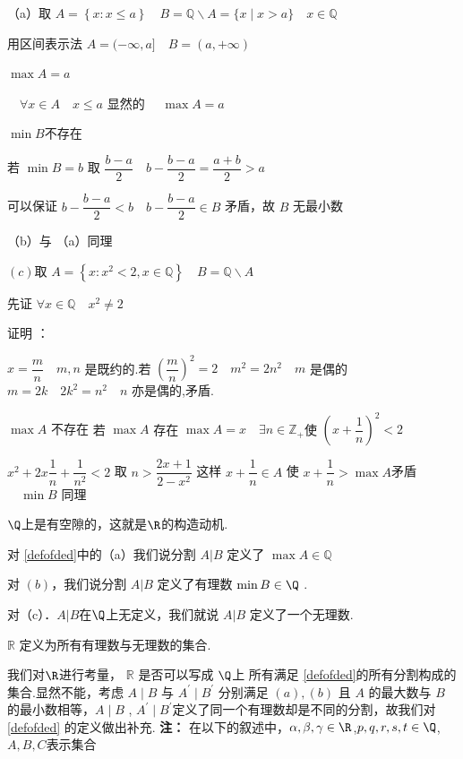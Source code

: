 \begin{example}
	（a）取 $A=\left\{x:x\leqslant a\right\}\quad B=\mathbb{Q} \backslash A=\{x \mid x>a\} \quad x \in \mathbb{Q}$
	
	用区间表示法 $A=(-\infty, a] \quad B=(a,+\infty)$
	
	$\max A=a$ 
	
	$ \quad \forall x \in A \quad x \leqslant a$ 显然的 $\quad\max A=a$
	
	$\min B  $不存在 
	
	若 $\min B=b$ 取 $\dfrac{b-a}{2} \quad b-\dfrac{b-a}{2}=\dfrac{a+b}{2}>a$
	
	可以保证 $b-\dfrac{b-a}{2}<b \quad b-\dfrac{b-a}{2} \in B$ 矛盾，故 $B$ 无最小数
	
	（b）与 （a）同理
	
	$(c)$取 $A=\left\{x :x^2<2, x \in \mathbb{Q}\right\} \quad B=\mathbb{Q} \backslash A$
	
	先证 $\forall x \in \mathbb{Q}\quad x^2 \neq 2$
	
	证明 ：
	
	$x=\dfrac{m}{n}\quad m,n$ 是既约的.若 $\left(\dfrac{m}{n}\right)^2=2 \quad m^2=2 n^2 \quad m$ 是偶的 $m=2 k \quad 2 k^2=n^2\quad n$ 亦是偶的,矛盾.
	
	$\max A \text{ 不存在}$ 
	若 $\max A$ 存在 $\max A=x \quad \exists n \in \mathbb{Z}_{+}$使 $\left(x+\dfrac{1}{n}\right)^2<2$
	
	$x^2+2 x \dfrac{1}{n}+\dfrac{1}{n^2}<2$ 取 $n>\dfrac{2x+1}{2-x^2}$ 这样 $x+\dfrac{1}{n} \in A$ 使 $x+\dfrac{1}{n}>\max A$矛盾 $ \quad \min B$ 同理
\end{example}
$\Q$上是有空隙的，这就是$\R$的构造动机.
\begin{definition}
	对 \ref{defofded}中的（a）我们说分割 $A | B$ 定义了 $\max A \in \mathbb{Q}$
	
	对 $(b)$，我们说分割 $A | B$ 定义了有理数 $\min B\in \Q$ .
	
	对（c）．$A|B$在$\Q$上无定义，我们就说 $A| B$ 定义了一个无理数.
	
	$\mathbb{R}$ 定义为所有有理数与无理数的集合.
	
\end{definition}

我们对$\R$进行考量， $\mathbb{R}$ 是否可以写成 $\Q$上 所有满足 \ref{defofded}的所有分割构成的集合.显然不能，考虑 $A \mid B$ 与 $A^{\prime} \mid B^{\prime}$ 分别满足 $(a), (b)$ 且 $A$ 的最大数与 $B$ 的最小数相等，$A \mid B$ , $A^{\prime} \mid B^{\prime}$定义了同一个有理数却是不同的分割，故我们对 \ref{defofded} 的定义做出补充.
\textbf{注：}
	在以下的叙述中，$\alpha,\beta,\gamma\in\R$,$p,q,r,s,t\in\Q$,$A,B,C\text{表示集合}$



